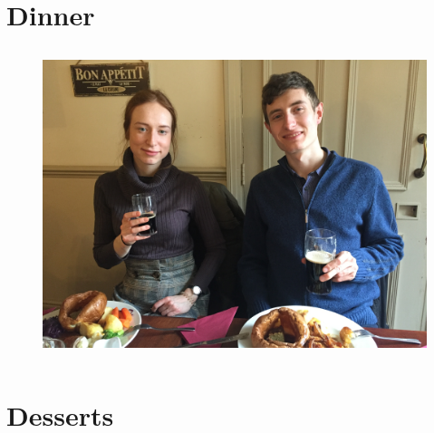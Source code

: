 \documentclass[%
titlepage,
b5paper,
twoside,
11pt
]{book}
\begin{document}

\newpage

\newpage

\newpage

\newpage

\newpage


\chapter{Dinner}

\begin{figure}[h]
	\centering
	\includegraphics[height=9cm]{pic/chapter2}
\end{figure}


\newpage

\newpage

\newpage

\newpage

\newpage

\newpage

\newpage

\newpage
\newpage

\newpage

\newpage

\newpage

\newpage

\newpage

\newpage

\chapter{Desserts}
\end{document}
